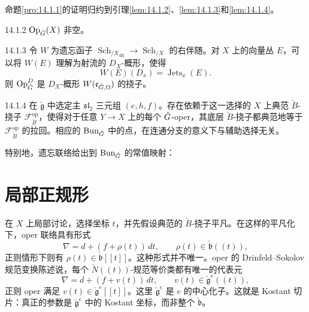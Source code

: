 命题\ref{pro:14.1.1}的证明归约到引理\ref{lem:14.1.2}、\ref{lem:14.1.3}和\ref{lem:14.1.4}。
\begin{lemma}{}{14.1.2}
$\operatorname{Op}_{\check{G}}(X)$ 非空。
\end{lemma}
\begin{lemma}{}{14.1.3}
令 $W$ 为遗忘函子 $\operatorname{Sch}_{/X_{\mathrm{dR}}}\to\operatorname{Sch}_{/X}$ 的右伴随。对 $X$ 上的向量丛 $E$，可以将 $W(E)$ 理解为射流的 $D_X$-概形，使得
\[W(E)(D_x)=\operatorname{Jets}_x(E).\]
则 $\operatorname{Op}^D_{\check{G}}$ 是 $D_X$-概形 $W(\mathfrak c_{\check{G},\Omega})$ 的挠子。
\end{lemma}
\begin{lemma}{}{14.1.4}
在 $\check{\mathfrak g}$ 中选定主 $\mathfrak{sl}_2$ 三元组 $(e,h,f)$。存在依赖于这一选择的 $X$ 上典范 $\check B$-挠子 $\mathcal F^{\mathrm{op}}_{\check B}$，使得对于任意 $Y\to X$ 上的每个 $\check{G}$-oper，其底层 $\check B$-挠子都典范地等于 $\mathcal F^{\mathrm{op}}_{\check B}$ 的拉回。相应的 $\operatorname{Bun}_{\check{G}}$ 中的点，在连通分支的意义下与辅助选择无关。
\end{lemma}

特别地，遗忘联络给出到 $\operatorname{Bun}_{\check{G}}$ 的常值映射：

\section{局部正规形}\label{sec:14.2}
在 $X$ 上局部讨论，选择坐标 $t$，并先假设典范的 $\check B$-挠子平凡。在这样的平凡化下，oper 联络具有形式
\[\nabla=d+(f+\rho(t))\,dt,\qquad\rho(t)\in\check{\mathfrak b}((t)),\]
正则情形下则有 $\rho(t)\in\check{\mathfrak b}[[t]]$。这种形式并不唯一。oper 的 Drinfeld–Sokolov 规范变换陈述\cite{BD05,Fre02}说，每个 $\check N((t))$-规范等价类都有唯一的代表元
\[\nabla=d+(f+v(t))\,dt,\qquad v(t)\in\check{\mathfrak g}^{e}((t)),\]
正则 oper 满足 $v(t)\in\check{\mathfrak g}^{e}[[t]]$。这里 $\check{\mathfrak g}^{e}$ 是 $e$ 的中心化子。这就是 Kostant 切片：真正的参数是 $\check{\mathfrak g}^{e}$ 中的 Kostant 坐标，而非整个 $\check{\mathfrak b}$。

